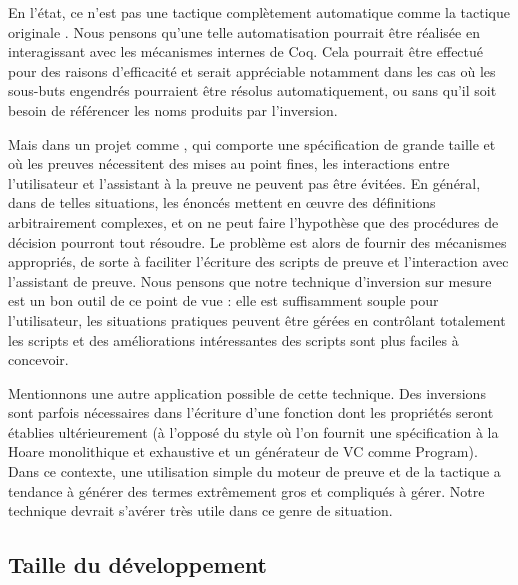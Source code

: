 En l'état, ce n'est pas une tactique complètement automatique
comme la tactique originale \inversion.
Nous pensons qu'une telle automatisation pourrait être réalisée
en interagissant avec les mécanismes internes de Coq.
Cela pourrait être effectué pour des raisons d'efficacité et
serait appréciable notamment dans les cas où les sous-buts engendrés
pourraient être résolus automatiquement,
ou sans qu'il soit besoin de référencer les noms produits par l'inversion.

Mais dans un projet comme \simsoccert,
qui comporte une spécification de grande taille
et où les preuves nécessitent des mises au point fines,
les interactions entre l'utilisateur et l'assistant à la preuve
ne peuvent pas être évitées.
En général, dans de telles situations, les énoncés mettent en {\oe}uvre
des définitions arbitrairement complexes,
et on ne peut faire l'hypothèse que des procédures de décision
pourront tout résoudre.
Le problème est alors de fournir des mécanismes appropriés,
de sorte à faciliter l'écriture des scripts de preuve et l'interaction
avec l'assistant de preuve.
Nous pensons que notre technique d'inversion sur mesure est un bon outil
de ce point de vue :
elle est suffisamment souple pour l'utilisateur,
les situations pratiques peuvent être gérées
en contrôlant totalement les scripts
et des améliorations intéressantes des scripts
sont plus faciles à concevoir.

Mentionnons une autre application possible de cette technique.
Des inversions sont parfois nécessaires dans l'écriture d'une fonction
dont les propriétés seront établies ultérieurement
(à l'opposé du style où l'on fournit une spécification à la Hoare
monolithique et exhaustive et un générateur de VC comme Program).
Dans ce contexte, une utilisation simple du moteur de preuve
et de la tactique \inversion a tendance à générer des termes
extrêmement gros et compliqués à gérer.
Notre technique devrait s'avérer très utile dans ce genre de situation.

\subsection*{Taille du développement}

